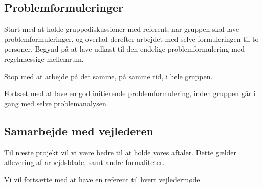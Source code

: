 \documentclass[a4paper,12pt,oneside,article]{memoir}
\begin{document}
    

    \subsection{Problemformuleringer}

          Start med at holde gruppediskussioner med referent, når gruppen skal lave problemformuleringer, og overlad derefter arbejdet med selve formuleringen til to personer.
        Begynd på at lave udkast til den endelige problemformulering med regelmæssige mellemrum.

        Stop med at arbejde på det samme, på samme tid, i hele gruppen.

        Fortsæt med at lave en god initierende problemformulering, inden gruppen går i gang med selve problemanalysen.


    \subsection{Samarbejde med vejlederen}

    Til næste projekt vil vi være bedre til at holde vores aftaler. Dette gælder aflevering af arbejdsblade, samt andre formaliteter.

    Vi vil fortsætte med at have en referent til hvert vejledermøde.

\end{document}
